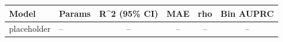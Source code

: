 \begin{tabular}{llcccc}
\toprule
Model & Params & R^2 (95\% CI) & MAE & rho & Bin AUPRC \\
\midrule
placeholder & -- & -- & -- & -- & -- \\
\bottomrule
\end{tabular}
